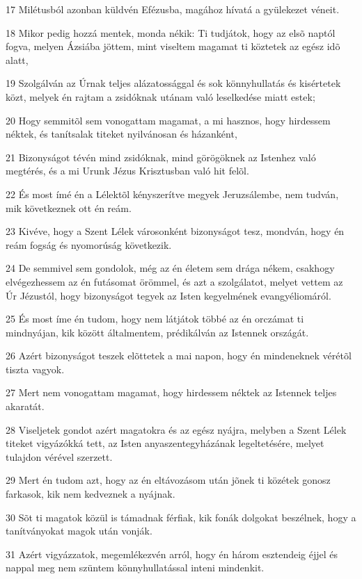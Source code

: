 \par 17 Milétusból azonban küldvén Efézusba, magához hívatá a gyülekezet véneit.
\par 18 Mikor pedig hozzá mentek, monda nékik: Ti tudjátok, hogy az elsõ naptól fogva, melyen Ázsiába jöttem, mint viseltem magamat ti köztetek az egész idõ alatt,
\par 19 Szolgálván az Úrnak teljes alázatossággal és sok könnyhullatás és kisértetek közt, melyek én rajtam a zsidóknak utánam való  leselkedése miatt estek;
\par 20 Hogy semmitõl sem vonogattam magamat, a mi hasznos, hogy hirdessem néktek, és tanítsalak titeket nyilvánosan és házanként,
\par 21 Bizonyságot tévén mind zsidóknak, mind görögöknek az Istenhez való megtérés, és a mi Urunk Jézus Krisztusban való hit  felõl.
\par 22 És most ímé én a Lélektõl kényszerítve megyek Jeruzsálembe, nem tudván, mik következnek ott én reám.
\par 23 Kivéve, hogy a Szent Lélek városonként bizonyságot tesz, mondván, hogy én reám fogság és nyomorúság következik.
\par 24 De semmivel sem gondolok, még az én életem sem drága nékem, csakhogy elvégezhessem az én futásomat örömmel, és azt a szolgálatot,  melyet vettem az Úr Jézustól, hogy bizonyságot tegyek az Isten kegyelmének evangyéliomáról.
\par 25 És most íme én tudom, hogy nem látjátok többé az én orczámat ti mindnyájan, kik között általmentem, prédikálván az Istennek országát.
\par 26 Azért bizonyságot teszek elõttetek a mai napon, hogy én mindeneknek vérétõl tiszta vagyok.
\par 27 Mert nem vonogattam magamat, hogy hirdessem néktek az Istennek teljes akaratát.
\par 28 Viseljetek gondot azért magatokra és az egész nyájra,  melyben a Szent Lélek titeket vigyázókká tett, az Isten anyaszentegyházának legeltetésére, melyet tulajdon vérével szerzett.
\par 29 Mert én tudom azt, hogy az én eltávozásom után jõnek ti közétek gonosz farkasok, kik nem kedveznek a nyájnak.
\par 30 Sõt ti magatok közül is támadnak férfiak, kik fonák dolgokat beszélnek, hogy a tanítványokat magok után vonják.
\par 31 Azért vigyázzatok, megemlékezvén arról, hogy én három esztendeig éjjel és nappal meg nem szüntem könnyhullatással inteni mindenkit.
